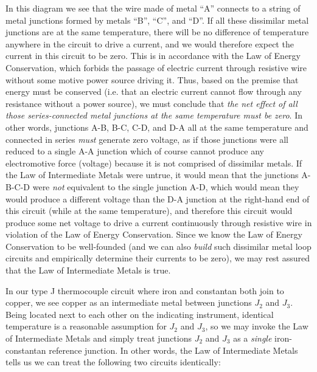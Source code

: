 In this diagram we see that the wire made of metal ``A'' connects to a string of metal junctions formed by metals ``B'', ``C'', and ``D''.  If all these dissimilar metal junctions are at the same temperature, there will be no difference of temperature anywhere in the circuit to drive a current, and we would therefore expect the current in this circuit to be zero.  This is in accordance with the Law of Energy Conservation, which forbids the passage of electric current through resistive wire without some motive power source driving it.  Thus, based on the premise that energy must be conserved (i.e. that an electric current cannot flow through any resistance without a power source), we must conclude that \textit{the net effect of all those series-connected metal junctions at the same temperature must be zero}.  In other words, junctions A-B, B-C, C-D, and D-A all at the same temperature and connected in series \textit{must} generate zero voltage, as if those junctions were all reduced to a single A-A junction which of course cannot produce any electromotive force (voltage) because it is not comprised of dissimilar metals.  If the Law of Intermediate Metals were untrue, it would mean that the junctions A-B-C-D were \textit{not} equivalent to the single junction A-D, which would mean they would produce a different voltage than the D-A junction at the right-hand end of this circuit (while at the same temperature), and therefore this circuit would produce some net voltage to drive a current continuously through resistive wire in violation of the Law of Energy Conservation.  Since we know the Law of Energy Conservation to be well-founded (and we can also \textit{build} such dissimilar metal loop circuits and empirically determine their currents to be zero), we may rest assured that the Law of Intermediate Metals is true.

\filbreak

In our type J thermocouple circuit where iron and constantan both join to copper, we see copper as an intermediate metal between junctions $J_2$ and $J_3$.  Being located next to each other on the indicating instrument, identical temperature is a reasonable assumption for $J_2$ and $J_3$, so we may invoke the Law of Intermediate Metals and simply treat junctions $J_2$ and $J_3$ as a \textit{single} iron-constantan reference junction.  In other words, the Law of Intermediate Metals tells us we can treat the following two circuits identically:

